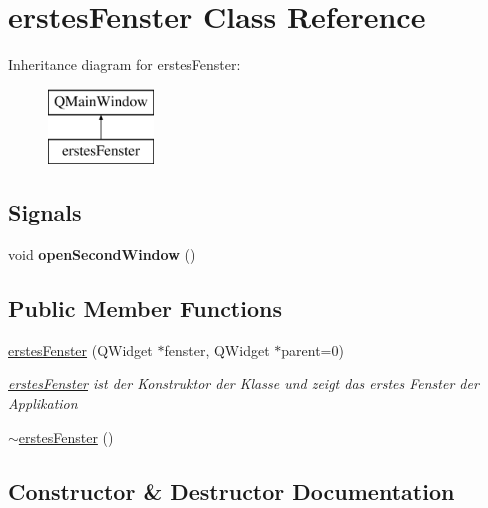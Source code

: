 \hypertarget{classerstes_fenster}{}\section{erstes\+Fenster Class Reference}
\label{classerstes_fenster}
Inheritance diagram for erstes\+Fenster\+:\begin{figure}[H]
\begin{center}
\leavevmode
\includegraphics[height=2.000000cm]{classerstes_fenster}
\end{center}
\end{figure}
\subsection*{Signals}
\begin{DoxyCompactItemize}
\item 
void {\bfseries open\+Second\+Window} ()\hypertarget{classerstes_fenster_acd6eaff887abe49e7082b6c966161830}{}\label{classerstes_fenster_acd6eaff887abe49e7082b6c966161830}

\end{DoxyCompactItemize}
\subsection*{Public Member Functions}
\begin{DoxyCompactItemize}
\item 
\hyperlink{classerstes_fenster_a7fe3a7ba4dba505cf0614d43bc8a536a}{erstes\+Fenster} (Q\+Widget $\ast$fenster, Q\+Widget $\ast$parent=0)
\begin{DoxyCompactList}\small\item\em \hyperlink{classerstes_fenster}{erstes\+Fenster} ist der Konstruktor der Klasse und zeigt das erstes Fenster der Applikation \end{DoxyCompactList}\item 
\hyperlink{classerstes_fenster_a5d7be8cf1dbcf7fd8b2544d36170318e}{$\sim$erstes\+Fenster} ()
\end{DoxyCompactItemize}


\subsection{Constructor \& Destructor Documentation}
